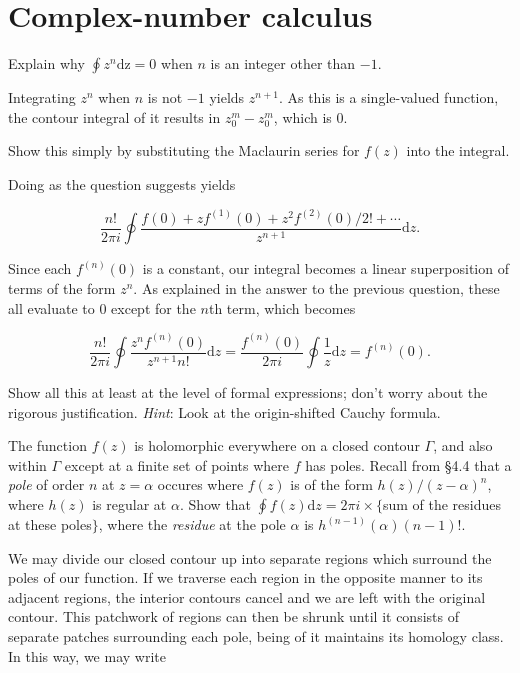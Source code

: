 \documentclass[../the-road-to-reality.tex]{subfiles}
\begin{document}
\section{Complex-number calculus}

\begin{questions}
	
\question Explain why $\oint{z^n}\mathrm{dz}=0$ when $n$ is an integer other than $-1$.

\begin{solution}
	Integrating $z^n$ when $n$ is not $-1$ yields $z^{n+1}$. As this is a single-valued function, the contour integral of it results in $z_0^m - z_0^m$, which is $0$.
\end{solution}

\question Show this simply by substituting the Maclaurin series for $f(z)$ into the integral.

\begin{solution}
	Doing as the question suggests yields
	
	\[
		\frac{n!}{2\pi{i}}\oint\frac{f(0) + zf^{(1)}(0) + z^2f^{(2)}(0)/2! + \cdots}{z^{n+1}}\mathrm{d}z
	.\] 	

	Since each $f^{(n)}(0)$ is a constant, our integral becomes a linear superposition of terms of the form $z^n$. As explained in the answer to the previous question, these all evaluate to $0$ except for the $n$th term, which becomes
	
	\[
	\frac{n!}{2\pi{i}}\oint\frac{z^nf^{(n)}(0)}{z^{n+1}n!}\mathrm{d}z = \frac{f^{(n)}(0)}{2\pi{i}}\oint\frac{1}{z}\mathrm{d}z = f^{(n)}(0)
	.\] 
\end{solution}

\question Show all this at least at the level of formal expressions; don't worry about the rigorous justification. \textit{Hint}: Look at the origin-shifted Cauchy formula.

\question The function $f(z)$ is holomorphic everywhere on a closed contour $\Gamma$, and also within $\Gamma$ except at a finite set of points where $f$ has poles. Recall from \S4.4 that a \textit{pole} of order $n$ at $z=\alpha$ occures where $f(z)$ is of the form $h(z)/(z-\alpha)^n$, where $h(z)$ is regular at $\alpha$. Show that $\oint{f(z)}\mathrm{d}z=2\pi{i}\times\{$sum of the residues at these poles$\}$, where the \textit{residue} at the pole $\alpha$ is $h^{(n-1)}(\alpha)(n-1)!$.

\begin{solution}
	We may divide our closed contour up into separate regions which surround the poles of our function. If we traverse each region in the opposite manner to its adjacent regions, the interior contours cancel and we are left with the original contour. This patchwork of regions can then be shrunk until it consists of separate patches surrounding each pole, being of it maintains its homology class. In this way, we may write
	

\end{solution}
\end{questions}
\end{document}
